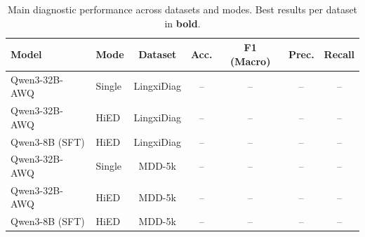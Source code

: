 \begin{table}[t]
\centering
\caption{Main diagnostic performance across datasets and modes. Best results per dataset in \textbf{bold}.}
\label{tab:main-results}
\begin{tabular}{llccccc}
\toprule
\textbf{Model} & \textbf{Mode} & \textbf{Dataset} & \textbf{Acc.} & \textbf{F1 (Macro)} & \textbf{Prec.} & \textbf{Recall} \\
\midrule
Qwen3-32B-AWQ & Single & LingxiDiag & -- & -- & -- & -- \\
Qwen3-32B-AWQ & HiED  & LingxiDiag & -- & -- & -- & -- \\
Qwen3-8B (SFT) & HiED  & LingxiDiag & -- & -- & -- & -- \\
\midrule
Qwen3-32B-AWQ & Single & MDD-5k & -- & -- & -- & -- \\
Qwen3-32B-AWQ & HiED  & MDD-5k & -- & -- & -- & -- \\
Qwen3-8B (SFT) & HiED  & MDD-5k & -- & -- & -- & -- \\
\bottomrule
\end{tabular}
\end{table}
